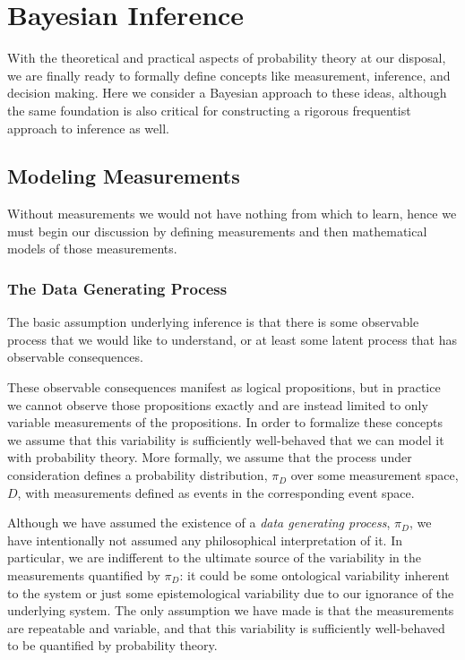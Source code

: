 \chapter{Bayesian Inference}

With the theoretical and practical aspects of probability
theory at our disposal, we are finally ready to formally define 
concepts like measurement, inference, and decision making.  
Here we consider a Bayesian approach to these ideas, although
the same foundation is also critical for constructing a rigorous
frequentist approach to inference as well.

\section{Modeling Measurements}

Without measurements we would not have nothing from which
to learn, hence we must begin our discussion by defining
measurements and then mathematical models of those 
measurements.

\subsection{The Data Generating Process}

The basic assumption underlying inference is that there is some
observable process that we would like to understand, or at least
some latent process that has observable consequences.

These observable consequences manifest as logical propositions,
but in practice we cannot observe those propositions exactly
and are instead limited to only variable measurements of the
propositions.  In order to formalize these concepts we assume 
that this variability is sufficiently well-behaved that we can model 
it with probability theory.  More formally, we assume that the process 
under consideration defines a probability distribution, $\pi_{D}$ 
over some measurement space, $D$, with measurements defined 
as events in the corresponding event space.  

Although we have assumed the existence of a \emph{data
generating process}, $\pi_{D}$, we have intentionally not
assumed any philosophical interpretation of it.  In particular, we
are indifferent to the ultimate source of the variability in the
measurements quantified by $\pi_{D}$: it could be some
ontological variability inherent to the system or just some
epistemological variability due to our ignorance of the 
underlying system.  The only assumption we have made is 
that the measurements are repeatable and variable, and 
that this variability is sufficiently well-behaved to be quantified 
by probability theory. 


